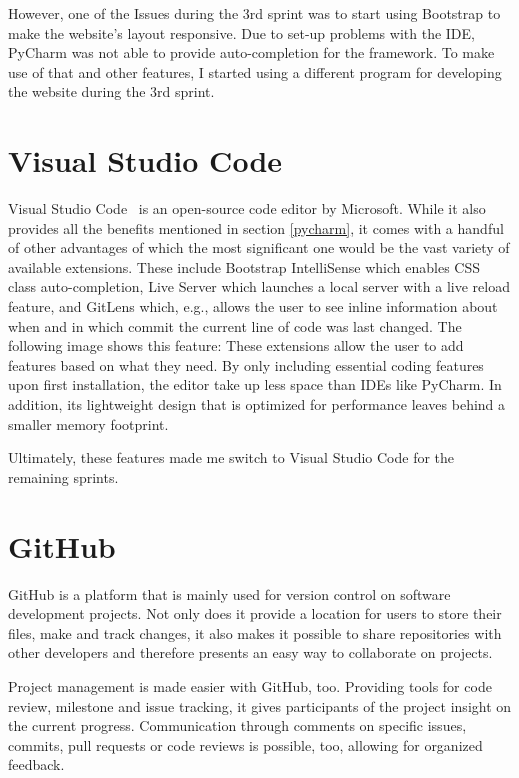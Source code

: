 However, one of the Issues during the 3rd sprint was to start using Bootstrap to make the website's layout responsive. Due to set-up problems with the IDE, PyCharm was not able to provide auto-completion for the framework. To make use of that and other features, I started using a different program for developing the website during the 3rd sprint.

\section{Visual Studio Code}
Visual Studio Code~\cite{vscode} is an open-source code editor by Microsoft. While it also provides all the benefits mentioned in section \ref{pycharm}, it comes with a handful of other advantages of which the most significant one would be the vast variety of available extensions.
These include Bootstrap IntelliSense which enables CSS class auto-completion, Live Server which launches a local server with a live reload feature, and GitLens which, e.g., allows the user to see inline information about when and in which commit the current line of code was last changed. The following image shows this feature:
These extensions allow the user to add features based on what they need. By only including essential coding features upon first installation, the editor take up less space than IDEs like PyCharm.
In addition, its lightweight design that is optimized for performance leaves behind a smaller memory footprint.

Ultimately, these features made me switch to Visual Studio Code for the remaining sprints.

\section{GitHub}
GitHub is a platform that is mainly used for version control on software development projects. Not only does it provide a location for users to store their files, make and track changes, it also makes it possible to share repositories with other developers and therefore presents an easy way to collaborate on projects.

Project management is made easier with GitHub, too. Providing tools for code review, milestone and issue tracking, it gives participants of the project insight on the current progress. Communication through comments on specific issues, commits, pull requests or code reviews is possible, too, allowing for organized feedback.

